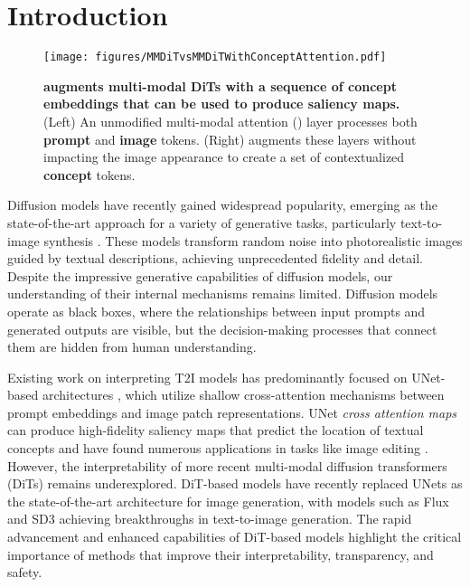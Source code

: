 

\section{Introduction}

\begin{figure*}
    \centering
    \texttt{[image: figures/MMDiTvsMMDiTWithConceptAttention.pdf]}
    \vspace{-0.22in}
    \caption{\textbf{\tool{} augments multi-modal DiTs with a sequence of concept embeddings that can be used to produce saliency maps.} (Left) An unmodified multi-modal attention (\layername) layer processes both \textcolor{myblue}{\textbf{prompt}} and \textcolor{myorange}{\textbf{image}} tokens. (Right) \tool{} augments these layers without impacting the image appearance to create a set of contextualized \textcolor{mygreen}{\textbf{concept}} tokens.
    }
    \label{fig:mmattn_vs_mmattn_with_concept_attention_explanatory}
\end{figure*}

Diffusion models have recently gained widespread popularity, emerging as the state-of-the-art approach for a variety of generative tasks, particularly text-to-image synthesis \cite{rombach_high-resolution_2022}. These models transform random noise into photorealistic images guided by textual descriptions, achieving unprecedented fidelity and detail. Despite the impressive generative capabilities of diffusion models, our understanding of their internal mechanisms remains limited. Diffusion models operate as black boxes, where the relationships between input prompts and generated outputs are visible, but the decision-making processes that connect them are hidden from human understanding.

Existing work on interpreting T2I models has predominantly focused on UNet-based architectures \cite{podell_sdxl_2023, rombach_high-resolution_2022}, which utilize shallow cross-attention mechanisms between prompt embeddings and image patch representations. 
UNet \textit{cross attention maps} can produce high-fidelity saliency maps that predict the location of textual concepts \cite{tang_what_2022} and have found numerous applications in tasks like image editing \cite{hertz_prompt--prompt_2022, chefer_attend-and-excite_2023}. However, the interpretability of more recent  multi-modal diffusion transformers (DiTs) remains underexplored. DiT-based models have recently replaced UNets \cite{ronneberger_u-net_2015} as the state-of-the-art architecture for image generation, with models such as Flux \cite{labs_flux_2023} and SD3 \cite{esser_scaling_2024} achieving breakthroughs in text-to-image generation. The rapid advancement and enhanced capabilities of DiT-based models highlight the critical importance of methods that improve their interpretability, transparency, and safety. %

